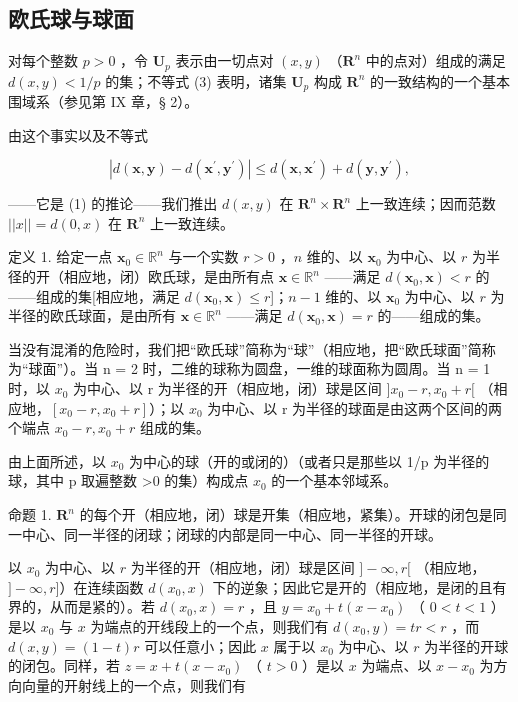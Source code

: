 \subsection{欧氏球与球面}

对每个整数 \(p > 0\) ，令 \(\mathbf{U}_p\) 表示由一切点对 \((x, y)\) （\(\mathbf{R}^n\) 中的点对）组成的满足 \(d(x, y) < 1/p\) 的集；不等式 (3) 表明，诸集 \(\mathbf{U}_p\) 构成 \(\mathbf{R}^n\) 的一致结构的一个基本围域系（参见第 IX 章，§ 2）。

由这个事实以及不等式

\[
\left| d \left(\boldsymbol {x}, \boldsymbol {y}\right) - d \left(\boldsymbol {x} ^ {\prime}, \boldsymbol {y} ^ {\prime}\right) \right| \leqslant d \left(\boldsymbol {x}, \boldsymbol {x} ^ {\prime}\right) + d \left(\boldsymbol {y}, \boldsymbol {y} ^ {\prime}\right),
\]

——它是 (1) 的推论——我们推出 \(d(x, y)\) 在 \(\mathbf{R}^n \times \mathbf{R}^n\) 上一致连续；因而范数 \(||x|| = d(0, x)\) 在 \(\mathbf{R}^n\) 上一致连续。

定义 1. 给定一点 \(\mathbf{x}_0 \in \mathbb{R}^n\) 与一个实数 \(r > 0\) ，\(n\) 维的、以 \(\mathbf{x}_0\) 为中心、以 \(r\) 为半径的开（相应地，闭）欧氏球，是由所有点 \(\mathbf{x} \in \mathbb{R}^n\) ——满足 \(d(\mathbf{x}_0, \mathbf{x}) < r\) 的——组成的集{[}相应地，满足 \(d(\mathbf{x}_0, \mathbf{x}) \leqslant r\){]}；\(n - 1\) 维的、以 \(\mathbf{x}_0\) 为中心、以 \(r\) 为半径的欧氏球面，是由所有 \(\mathbf{x} \in \mathbb{R}^n\) ——满足 \(d(\mathbf{x}_0, \mathbf{x}) = r\) 的——组成的集。

当没有混淆的危险时，我们把“欧氏球”简称为“球”（相应地，把“欧氏球面”简称为“球面”）。当 n = 2 时，二维的球称为圆盘，一维的球面称为圆周。当 n = 1 时，以 \(x_{0}\) 为中心、以 r 为半径的开（相应地，闭）球是区间 \(]x_{0} - r, x_{0} + r[\) （相应地，\([x_{0} - r, x_{0} + r]\)）；以 \(x_{0}\) 为中心、以 r 为半径的球面是由这两个区间的两个端点 \(x_{0} - r, x_{0} + r\) 组成的集。

由上面所述，以 \(x_{0}\) 为中心的球（开的或闭的）（或者只是那些以 1/p 为半径的球，其中 p 取遍整数 \textgreater0 的集）构成点 \(x_{0}\) 的一个基本邻域系。

命题 1. \(\mathbf{R}^n\) 的每个开（相应地，闭）球是开集（相应地，紧集）。开球的闭包是同一中心、同一半径的闭球；闭球的内部是同一中心、同一半径的开球。

以 \(x_0\) 为中心、以 \(r\) 为半径的开（相应地，闭）球是区间 \(] - \infty, r[\) （相应地，\(] - \infty, r]\)）在连续函数 \(d(x_0, x)\) 下的逆象；因此它是开的（相应地，是闭的且有界的，从而是紧的）。若 \(d(x_0, x) = r\) ，且 \(y = x_0 + t(x - x_0)\) （ \(0 < t < 1\) ）是以 \(x_0\) 与 \(x\) 为端点的开线段上的一个点，则我们有 \(d(x_0, y) = tr < r\) ，而 \(d(x, y) = (1 - t)r\) 可以任意小；因此 \(x\) 属于以 \(x_0\) 为中心、以 \(r\) 为半径的开球的闭包。同样，若 \(z = x + t(x - x_0)\) （ \(t > 0\) ）是以 \(x\) 为端点、以 \(x - x_0\) 为方向向量的开射线上的一个点，则我们有

